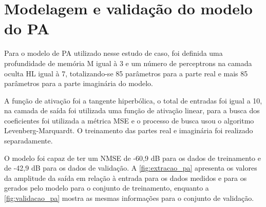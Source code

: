 \section{Modelagem e validação do modelo do PA} \label{sec:estudoi-model}
Para o modelo de PA utilizado nesse estudo de caso, foi definida uma profundidade de memória M igual à 3 e um número de perceptrons na camada oculta HL igual à 7, totalizando-se 85 parâmetros para a parte real e mais 85 parâmetros para a parte imaginária do modelo.


A função de ativação foi a tangente hiperbólica, o total de entradas foi igual a 10, na camada de saída foi utilizada uma função de ativação linear, para a busca dos coeficientes foi utilizada a métrica MSE e o processo de busca usou o algoritmo Levenberg-Marquardt. O treinamento das partes real e imaginária foi realizado separadamente.

O modelo foi capaz de ter um NMSE de -60,9 dB para os dados de treinamento e de -42,9 dB para os dados de validação. A \autoref{fig:extracao_pa} apresenta os valores da amplitude da saída em relação à entrada para os dados medidos e para os gerados pelo modelo para o conjunto de treinamento, enquanto a \autoref{fig:validacao_pa} mostra as mesmas informações para o conjunto de validação.

